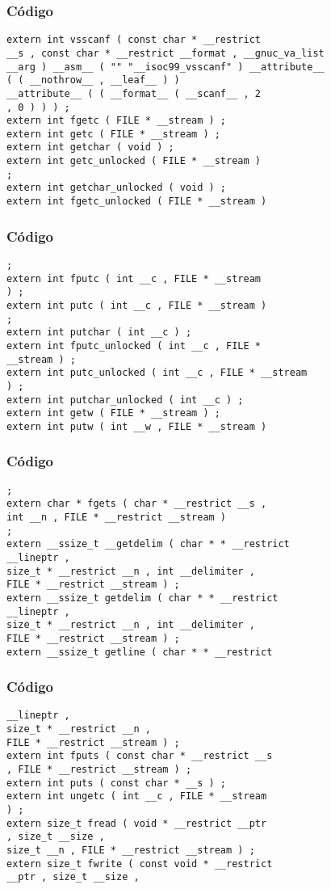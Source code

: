 \documentclass{beamer}
\begin{document}
\begin{frame}[fragile]
\frametitle{C\'odigo}
\begin{verbatim}
extern int vsscanf ( const char * __restrict 
__s , const char * __restrict __format , __gnuc_va_list 
__arg ) __asm__ ( "" "__isoc99_vsscanf" ) __attribute__ 
( ( __nothrow__ , __leaf__ ) ) 
__attribute__ ( ( __format__ ( __scanf__ , 2 
, 0 ) ) ) ; 
extern int fgetc ( FILE * __stream ) ; 
extern int getc ( FILE * __stream ) ; 
extern int getchar ( void ) ; 
extern int getc_unlocked ( FILE * __stream ) 
; 
extern int getchar_unlocked ( void ) ; 
extern int fgetc_unlocked ( FILE * __stream ) 
\end{verbatim}
\end{frame}
\begin{frame}[fragile]
\frametitle{C\'odigo}
\begin{verbatim}
; 
extern int fputc ( int __c , FILE * __stream 
) ; 
extern int putc ( int __c , FILE * __stream ) 
; 
extern int putchar ( int __c ) ; 
extern int fputc_unlocked ( int __c , FILE * 
__stream ) ; 
extern int putc_unlocked ( int __c , FILE * __stream 
) ; 
extern int putchar_unlocked ( int __c ) ; 
extern int getw ( FILE * __stream ) ; 
extern int putw ( int __w , FILE * __stream ) 
\end{verbatim}
\end{frame}
\begin{frame}[fragile]
\frametitle{C\'odigo}
\begin{verbatim}
; 
extern char * fgets ( char * __restrict __s , 
int __n , FILE * __restrict __stream ) 
; 
extern __ssize_t __getdelim ( char * * __restrict 
__lineptr , 
size_t * __restrict __n , int __delimiter , 
FILE * __restrict __stream ) ; 
extern __ssize_t getdelim ( char * * __restrict 
__lineptr , 
size_t * __restrict __n , int __delimiter , 
FILE * __restrict __stream ) ; 
extern __ssize_t getline ( char * * __restrict 
\end{verbatim}
\end{frame}
\begin{frame}[fragile]
\frametitle{C\'odigo}
\begin{verbatim}
__lineptr , 
size_t * __restrict __n , 
FILE * __restrict __stream ) ; 
extern int fputs ( const char * __restrict __s 
, FILE * __restrict __stream ) ; 
extern int puts ( const char * __s ) ; 
extern int ungetc ( int __c , FILE * __stream 
) ; 
extern size_t fread ( void * __restrict __ptr 
, size_t __size , 
size_t __n , FILE * __restrict __stream ) ; 
extern size_t fwrite ( const void * __restrict 
__ptr , size_t __size , 
\end{verbatim}
\end{frame}
\end{document}
